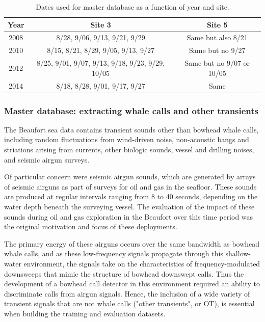 \documentclass[preprint,NumberedRefs]{JASAnew}
\begin{document}
\begin{table}[ht]
    \centering
    \caption{Dates used for master database as a function of year and site.}
    \label{tab:training_dates}
    \begin{tabular}{|c | c | c|}
        \hline
        Year & Site 3 & Site 5 \\
        \hline
        2008 & 8/28, 9/06, 9/13, 9/21, 9/29 & Same but also 8/21 \\
        2010 & 8/15, 8/21, 8/29, 9/05, 9/13, 9/27 & Same but no 9/27 \\
        2012 & 8/25, 9/01, 9/07, 9/13, 9/18, 9/23, 9/29, 10/05 & Same but no 9/07 or 10/05 \\
        2014 & 8/18, 8/28, 9/01, 9/17, 9/27 & Same \\
        \hline
    \end{tabular}
\end{table}

\subsubsection{\label{sec:TransientDetector}Master database: extracting whale calls and other transients}

The Beaufort sea data contains transient sounds other than bowhead whale calls, including random fluctuations from wind-driven noise, non-acoustic bangs and striations arising from currents, other biologic sounds, vessel and drilling noises, and seismic airgun surveys.  

Of particular concern were seismic airgun sounds\cite{dragoset2000introduction,guerra2011quantifying}, which are generated by arrays of seismic airguns as part of surveys for oil and gas in the seafloor.  These sounds are produced at regular intervals ranging from 8 to 40 seconds, depending on the water depth beneath the surveying vessel.  The evaluation of the impact of these sounds during oil and gas exploration in the Beaufort over this time period was the original motivation and focus of these deployments. \cite{blackwell2015effects,blackwell2017effects}

The primary energy of these airguns occurs over the same bandwidth as bowhead whale calls, and as these low-frequency signals propagate through this shallow-water environment, the signals take on the characteristics of frequency-modulated downsweeps that mimic the structure of bowhead downswept calls.  Thus the development of a bowhead call detector in this environment required an ability to discriminate calls from airgun signals.  Hence, the inclusion of a wide variety of transient signals that are not whale calls ("other transients", or OT), is essential when building the training and evaluation datasets.
\end{document}

